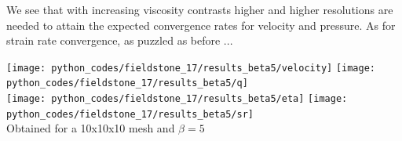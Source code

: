 We see that with increasing viscosity contrasts higher and higher resolutions are needed to 
attain the expected convergence rates for velocity and pressure. As for strain rate convergence, 
as puzzled as before ...



\begin{center}
\texttt{[image: python\_codes/fieldstone\_17/results\_beta5/velocity]}
\texttt{[image: python\_codes/fieldstone\_17/results\_beta5/q]}\\
\texttt{[image: python\_codes/fieldstone\_17/results\_beta5/eta]}
\texttt{[image: python\_codes/fieldstone\_17/results\_beta5/sr]}\\
{\captionfont Obtained for a 10x10x10 mesh and $\beta=5$}
\end{center}


















